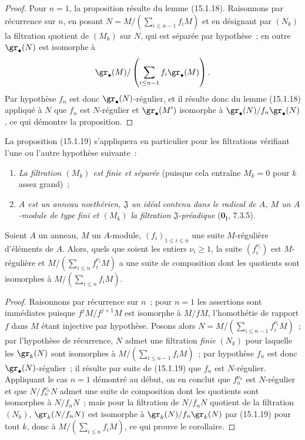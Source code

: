 \begin{proof}
Pour $n=1$, la proposition résulte du lemme (15.1.18). Raisonnons par
récurrence sur $n$, en posant
$N=M/(\sum_{i\leq n-1}f_iM)$
et en désignant par $(N_k)$ la filtration quotient de $(M_k)$ sur $N$, qui
est séparée par hypothèse~; en outre $\gr_\bullet(N)$ est isomorphe à
\[
  \gr_\bullet(M)/
  \left(\sum_{i\leq n-1}f_i\gr_\bullet(M)\right).
\]
Par hypothèse $f_n$ est donc $\gr_\bullet(N)$-régulier, et il résulte donc du
lemme (15.1.18) appliqué à $N$ que $f_n$ est $N$-régulier et
$\gr_\bullet(M')$ isomorphe à
$\gr_\bullet(N)/f_n\gr_\bullet(N)$, ce qui démontre la proposition.
\end{proof}

La proposition (15.1.19) s'appliquera en particulier pour les filtrations
vérifiant l'une ou l'autre hypothèse suivante~:
\begin{enumerate}
  \item[$1^\circ$] \emph{La filtration $(M_k)$ est finie et séparée} (puisque cela
  entraîne $M_k=0$ pour $k$ assez grand)~;
  \item[$2^\circ$] \emph{$A$ est un anneau noethérien, $\mathfrak{J}$ un idéal
  contenu dans le radical de $A$, $M$ un $A$-module de type fini et $(M_k)$
  la filtration $\mathfrak{J}$-préadique} ($\mathbf{0}_{\mathrm I}$, 7.3.5).
\end{enumerate}

\begin{corollary}[15.1.20]
\label{0.15.1.20-fr}
Soient $A$ un anneau, $M$ un $A$-module, $(f_i)_{1\leq i\leq n}$ une suite
$M$-régulière d'éléments de $A$. Alors, quels que soient les entiers
$\nu_i\geq1$, la suite $(f_i^{\nu_i})$ est $M$-régulière et
$M/(\sum_{i\leq n}f_i^{\nu_i}M)$ a une suite de composition dont les
quotients sont isomorphes à $M/(\sum_{i\leq n}f_iM)$.
\end{corollary}

\begin{proof}
Raisonnons par récurrence sur $n$~; pour $n=1$ les assertions sont immédiates
puisque $f^jM/f^{j+1}M$ est isomorphe à $M/fM$, l'homothétie de rapport $f$
dans $M$ étant injective par hypothèse. Posons alors
$N=M/(\sum_{i\leq n-1}f_i^{\nu_i}M)$~;
par l'hypothèse de récurrence, $N$ admet une filtration \emph{finie} $(N_k)$ pour
laquelle les $\gr_k(N)$ sont isomorphes à
$M/(\sum_{i\leq n-1}f_iM)$~; par hypothèse $f_n$ est donc
$\gr_\bullet(N)$-régulier~; il résulte par suite de (15.1.19) que $f_n$ est
$N$-régulier. Appliquant le cas $n=1$ démontré au début, on en conclut que
$f_n^{\nu_n}$ est $N$-régulier et que $N/f_n^{\nu_n}N$ admet une suite de
composition dont les quotients sont isomorphes à $N/f_nN$~; mais pour la
filtration de $N/f_nN$ quotient de la filtration $(N_k)$,
$\gr_k(N/f_nN)$ est isomorphe à $\gr_k(N)/f_n\gr_k(N)$ par (15.1.19) pour
tout $k$, donc à $M/(\sum_{i\leq n}f_iM)$, ce qui prouve le corollaire.
\end{proof}

